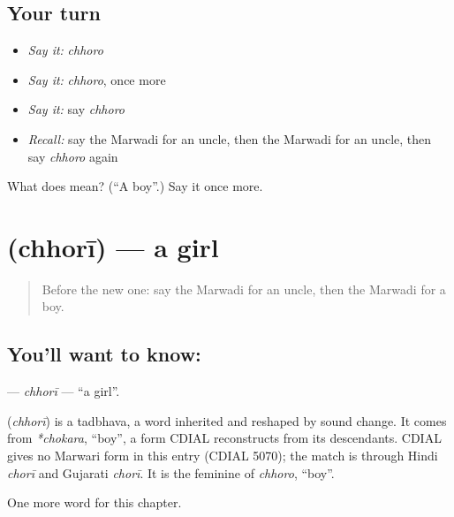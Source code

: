 \subsection*{Your turn}
\begin{itemize}
\raggedright
  \item \emph{Say it:} \emph{chhoro}
  \item \emph{Say it:} \emph{chhoro}, once more
  \item \emph{Say it:} say \emph{chhoro}
  \item \emph{Recall:} say the Marwadi for an uncle, then the Marwadi for an uncle, then say \emph{chhoro} again
\end{itemize}

\begin{tcolorbox}[breakable,colback=teal!4,colframe=teal!35!black,title={Before you move on}]
What does  mean? (\textquotedblleft{}A boy\textquotedblright{}.) Say it once more.
\end{tcolorbox}
\section[\texorpdfstring{\mw{छोरी} (chhorī)}{छोरी (chhorī)}]{ (chhorī) — a girl}

\label{lesson:MW-C49-chhori}



\begin{quote}
Before the new one: say the Marwadi for an uncle, then the Marwadi for a boy.
\end{quote}

\subsection*{You'll want to know: }
\textbf{} — \emph{chhorī} — \textquotedblleft{}a girl\textquotedblright{}.

\begin{cousinweb}
\textbf{} (\emph{chhorī}) is a tadbhava, a word inherited and reshaped by sound change. It comes from \emph{*chokara}, \textquotedblleft{}boy\textquotedblright{}, a form CDIAL reconstructs from its descendants. CDIAL gives no Marwari form in this entry (CDIAL 5070); the match is through Hindi \emph{chorī} and Gujarati \emph{chorī}. It is the feminine of \emph{chhoro}, \textquotedblleft{}boy\textquotedblright{}.
\end{cousinweb}

\begin{grammarlens}[title={What you've built}]
One more word for this chapter.
\end{grammarlens}

